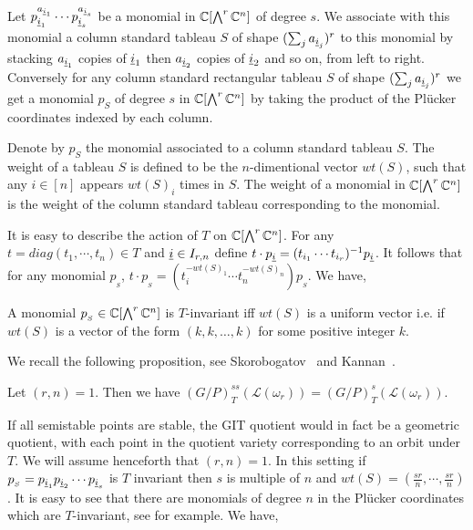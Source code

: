 \label{sec:torus_action}
Let \(p_{{\underline i}_1}^{a_{{\underline i}_1}}\cdots p_{{\underline i}_s}^{a_{{\underline i}_s}}\) be a monomial in \(\mathbb{C}[\bigwedge^r \mathbb{C}^n]\) of degree \(s\). We associate with this monomial a column standard tableau \(S\) of shape \((\sum_j  a_{{\underline i}_j} )^r  \) to this monomial by stacking $a_{{\underline i}_1}$ copies of ${\underline i}_1$ then $a_{{\underline i}_2}$ copies of ${\underline i}_2$ and so on, from left to right. Conversely for any column standard rectangular tableau \(S\) of shape \((\sum_j  a_{{\underline i}_j} )^r  \)  we get a monomial $p_{S}$ of degree \(s\) in \(\mathbb{C}[\bigwedge^r\mathbb{C}^n]\) by taking the product of the Pl\"{u}cker coordinates 
indexed by each column.  

Denote by \(p_{S}\) the monomial associated to a column standard tableau \(S\). The weight of a tableau \(S\) is defined to be the
\(n\)-dimentional vector \(wt(S)\), such that any \(i \in [n]\) appears \(wt(S)_i\) times in \(S\). The weight of a monomial in \(\mathbb{C}[\bigwedge^r\mathbb{C}^n]\) is the weight of the column standard tableau corresponding to the monomial.  

It is easy to describe the action of \(T\) on \(\mathbb{C}[\bigwedge^r\mathbb{C}^n]\).  For any \(t = diag(t_1,\cdots,t_n) \in T\) and \({\underline i} \in I_{r,n}\) define \(t\cdot p_{\underline i} = (t_{i_1}\cdots t_{i_r})^{-1}p_{\underline i}\).  It follows that for any monomial \(p_{_S}\), \(t\cdot p_{_S} = (t_i^{-wt(S)_1}\cdots t_n^{-wt(S)_n})p_{_S}\). 
We have, 
\begin{proposition}
\label{prop:tinv}
 A monomial \(p_{_S} \in \mathbb{C}[\bigwedge^r\mathbb{C}^n]\) is \(T\)-invariant iff \(wt(S)\) is a uniform vector i.e. if \(wt(S)\)  is a vector of the form $(k,k,\ldots,k)$ for some positive integer $k $.
\end{proposition}

We recall the following proposition, see Skorobogatov~\cite{skorobogatov1993swinnerton} and Kannan~\cite{kannan1998torus}.
\begin{proposition}
Let $(r,n)=1$. Then we have $(G/P)^{ss}_{T}({\mathcal L}(\omega_r)) = (G/P)^{s}_{T}({\mathcal L}(\omega_r)).$
\end{proposition}

If all semistable points are stable, the GIT quotient would in fact be a geometric quotient, with each point in the quotient variety corresponding to an orbit under $T$. We will assume 
henceforth that $(r,n)=1$. In this setting if  \(p_{_S} = p_{{\underline i}_1} p_{{\underline i}_2} \cdots p_{{\underline i}_s}\) is $T$ invariant then 
\(s\) is multiple of \(n\) and \(wt(S) = (\frac{sr}{n},\cdots,\frac{sr}{n})\). It is easy to see that there are monomials of degree \(n\) in the Pl\"{u}cker coordinates which are \(T\)-invariant, see \cite{bakshi2020torus} for example. We have,

